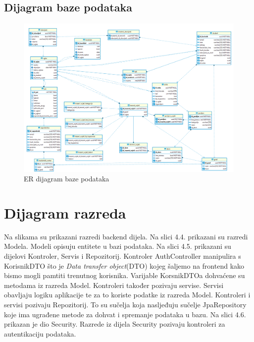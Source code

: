 	\subsection{Dijagram baze podataka}
	\begin{figure}[H]
		\includegraphics[scale=0.3]{dijagrami/baza.png} %
		\centering
		\caption{ER dijagram baze podataka}
		\label{fig:er}
	\end{figure}
	
	\eject
	
			
			
		\section{Dijagram razreda}
		
			Na slikama su prikazani razredi backend dijela. Na slici 4.4. prikazani su razredi Modela. Modeli opisuju entitete u bazi podataka. Na slici 4.5. prikazani su dijelovi Kontroler, Servis i Repozitorij. Kontroler AuthController manipulira s KorisnikDTO što je \textit{Data transfer object}(DTO) kojeg šaljemo na frontend kako bismo mogli pamtiti trenutnog korisnika. Varijable KorsnikDTOa dohvaćene su metodama iz razreda Model.
			Kontroleri također pozivaju servise. Servisi obavljaju logiku aplikacije te za to koriste podatke iz razreda Model. Kontroleri i servisi pozivaju Repozitorij. To su sučelja koja nasljeđuju sučelje JpaRepository koje ima ugrađene metode za dohvat i spremanje podataka u bazu. Na slici 4.6. prikazan je dio Security. Razrede iz dijela Security pozivaju kontroleri za autentikaciju podataka.
		
